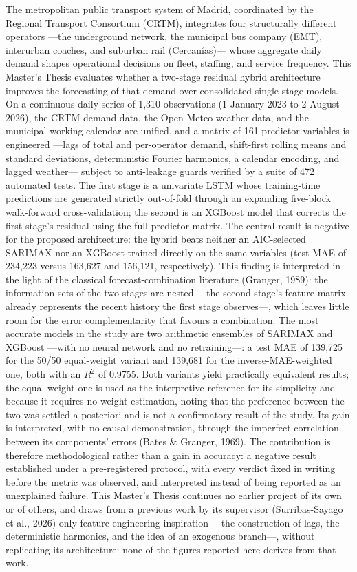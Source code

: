 The metropolitan public transport system of Madrid, coordinated by the Regional
Transport Consortium (CRTM), integrates four structurally different operators
---the underground network, the municipal bus company (EMT), interurban coaches,
and suburban rail (Cercan\'ias)--- whose aggregate daily demand shapes
operational decisions on fleet, staffing, and service frequency. This Master's
Thesis evaluates whether a two-stage residual hybrid architecture improves the
forecasting of that demand over consolidated single-stage models. On a continuous
daily series of 1,310 observations (1 January 2023 to 2 August 2026), the CRTM
demand data, the Open-Meteo weather data, and the municipal working calendar are
unified, and a matrix of 161 predictor variables is engineered ---lags of total
and per-operator demand, shift-first rolling means and standard deviations,
deterministic Fourier harmonics, a calendar encoding, and lagged weather---
subject to anti-leakage guards verified by a suite of 472 automated tests. The first stage is a univariate LSTM whose training-time
predictions are generated strictly out-of-fold through an expanding five-block
walk-forward cross-validation; the second is an XGBoost model that corrects the
first stage's residual using the full predictor matrix. The central result is
negative for the proposed architecture: the hybrid beats neither an
AIC-selected SARIMAX nor an XGBoost trained directly on the same variables
(test MAE of 234,223 versus 163,627 and 156,121, respectively). This finding is
interpreted in the light of the classical forecast-combination literature (Granger,
1989): the information sets of the two stages are nested ---the second stage's
feature matrix already represents the recent history the first stage observes---,
which leaves little room for the error complementarity that favours a
combination. The most accurate models in the
study are two arithmetic ensembles of SARIMAX and XGBoost ---with no neural network
and no retraining---: a test MAE of 139,725 for the 50/50 equal-weight variant and
139,681 for the inverse-MAE-weighted one, both with an $R^2$ of 0.9755. Both
variants yield practically equivalent results; the equal-weight one is used as the
interpretive reference for its simplicity and because it requires no weight
estimation, noting that the preference between the two was settled a posteriori and
is not a confirmatory result of the study. Its gain is interpreted, with no causal
demonstration, through the imperfect correlation between its components' errors
(Bates \& Granger, 1969). The contribution is therefore methodological rather than
a gain in accuracy: a negative result established under a pre-registered protocol,
with every verdict fixed in writing before the metric was observed, and interpreted
instead of being reported as an unexplained failure. This Master's Thesis continues
no earlier project
of its own or of others, and draws from a previous
work by its supervisor (Surribas-Sayago et al., 2026) only feature-engineering inspiration
---the construction of lags, the deterministic harmonics, and the idea of an exogenous
branch---, without replicating its architecture: none of the figures reported here
derives from that work.

